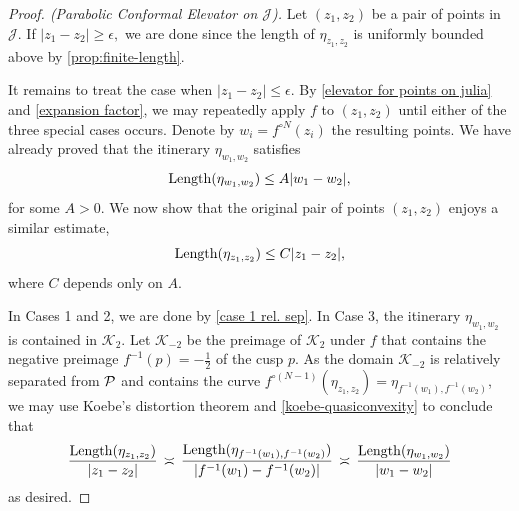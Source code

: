 \begin{proof}[Proof. (Parabolic Conformal Elevator on $\mathcal J$)] \label{parabolic-elevator}
Let  $(z_1,z_2)$ be a pair of points in $\mathcal J$. 
If $|z_{1}-z_{2}| \geq \epsilon,$ 
we are done since the length of $\eta_{z_1,z_2}$ is uniformly bounded above by  \cref{prop:finite-length}.

It remains to treat the case when $|z_{1}-z_{2}| \le \epsilon$. By  \cref{elevator for points on julia} and \cref{expansion factor}, we may repeatedly apply $f$ to $(z_1, z_2)$ until either of the three special cases occurs.
Denote by $w_i=f^{\circ N}(z_i)$ the resulting points. We have already proved that the itinerary $\eta_{w_1,w_2}$ satisfies
\begin{equation*}
	\operatorname{Length}(\eta_{w_1,w_2}) \leq A |w_1-w_2|,
\end{equation*}
for some $A>0$. We now show that the original pair of points $(z_1,z_2)$ enjoys a similar estimate,
\begin{equation*}
	\operatorname{Length}(\eta_{z_1,z_2}) \leq C |z_1-z_2|,
\end{equation*}
where $C$ depends only on $A$.

In Cases 1 and 2, we are done by \cref{case 1 rel. sep}. In Case 3, 
the itinerary $\eta_{w_1,w_2}$ is contained in $\mathcal K_2$. Let $\mathcal K_{-2}$ be the preimage of $\mathcal K_2$ under $f$ that contains the negative preimage $f^{-1}(p)=-\tfrac 12$ of the cusp $p$. 
As the domain $\mathcal K_{-2}$ is relatively separated from $\operatorname{\mathcal P}$ and contains the curve 
$f^{\circ (N-1)}(\eta_{z_1,z_2}) = \eta_{f^{-1}(w_1),f^{-1}(w_2)}$,
we may use Koebe's distortion theorem and \cref{koebe-quasiconvexity} to conclude that
\begin{equation}
	\frac{\operatorname{Length}(\eta_{z_1,z_2})}{|z_1-z_2|} \, \asymp \,
		\frac{\operatorname{Length}(\eta_{f^{-1}(w_1),f^{-1}(w_2)})}{|f^{-1}(w_1)-f^{-1}(w_2)|} \, \asymp \,
		\frac{\operatorname{Length}(\eta_{w_1,w_2})}{|w_1-w_2|}
\end{equation}
as desired.
\end{proof}




 

\printnomenclature

